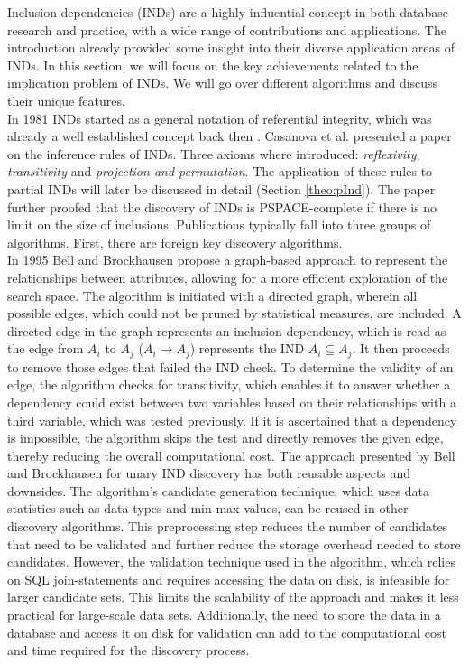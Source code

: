 
Inclusion dependencies (INDs) are a highly influential concept in both database research and practice, with a wide range of contributions and applications. The introduction already provided some insight into their diverse application areas of INDs. In this section, we will focus on the key achievements related to the implication problem of INDs. We will go over different algorithms and discuss their unique features. \\

In 1981 INDs started as a general notation of referential integrity, which was already a well established concept back then \cite{date1981referential}. Casanova et al. presented a paper \cite{casanova1982inclusion} on the inference rules of INDs. Three axioms where introduced: \textit{reflexivity}, \textit{transitivity} and \textit{projection and permutation}. The application of these rules to partial INDs will later be discussed in detail (Section \ref{theo:pInd}). The paper further proofed that the discovery of INDs is PSPACE-complete if there is no limit on the size of inclusions. Publications typically fall into three groups of algorithms. First, there are foreign key discovery algorithms. \\

In 1995 Bell and Brockhausen \cite{bell1995discovery} propose a graph-based approach to represent the relationships between attributes, allowing for a more efficient exploration of the search space. The algorithm is initiated with a directed graph, wherein all possible edges, which could not be pruned by statistical measures, are included. A directed edge in the graph represents an inclusion dependency, which is read as the edge from $A_i$ to $A_j$ ($A_i \rightarrow A_j$) represents the IND $A_i \subseteq A_j$. It then proceeds to remove those edges that failed the IND check. To determine the validity of an edge, the algorithm checks for transitivity, which enables it to answer whether a dependency could exist between two variables based on their relationships with a third variable, which was tested previously. If it is ascertained that a dependency is impossible, the algorithm skips the test and directly removes the given edge, thereby reducing the overall computational cost. The approach presented by Bell and Brockhausen for unary IND discovery has both reusable aspects and downsides. The algorithm's candidate generation technique, which uses data statistics such as data types and min-max values, can be reused in other discovery algorithms. This preprocessing step reduces the number of candidates that need to be validated and further reduce the storage overhead needed to store candidates. However, the validation technique used in the algorithm, which relies on SQL join-statements and requires accessing the data on disk, is infeasible for larger candidate sets. This limits the scalability of the approach and makes it less practical for large-scale data sets. Additionally, the need to store the data in a database and access it on disk for validation can add to the computational cost and time required for the discovery process.


